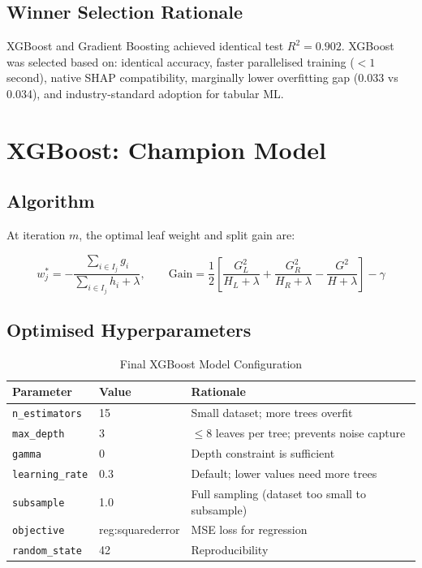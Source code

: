 \documentclass[12pt,a4paper]{report}
\begin{document}
\section{Winner Selection Rationale}

XGBoost and Gradient Boosting achieved identical test $R^2 = 0.902$. XGBoost was selected based on: identical accuracy, faster parallelised training ($< 1$ second), native SHAP compatibility, marginally lower overfitting gap (0.033 vs 0.034), and industry-standard adoption for tabular ML.

\chapter{XGBoost: Champion Model}

\section{Algorithm}

At iteration $m$, the optimal leaf weight and split gain are:

\begin{equation}
  w_j^* = -\frac{\sum_{i \in I_j} g_i}{\sum_{i \in I_j} h_i + \lambda}, \qquad
  \text{Gain} = \frac{1}{2}\left[\frac{G_L^2}{H_L+\lambda} + \frac{G_R^2}{H_R+\lambda} - \frac{G^2}{H+\lambda}\right] - \gamma
\end{equation}

\section{Optimised Hyperparameters}

\begin{table}[H]
\centering
\caption{Final XGBoost Model Configuration}
\begin{tabular}{lll}
\toprule
\textbf{Parameter} & \textbf{Value} & \textbf{Rationale} \\
\midrule
\texttt{n\_estimators}  & 15               & Small dataset; more trees overfit \\
\texttt{max\_depth}     & 3                & $\leq 8$ leaves per tree; prevents noise capture \\
\texttt{gamma}          & 0                & Depth constraint is sufficient \\
\texttt{learning\_rate} & 0.3              & Default; lower values need more trees \\
\texttt{subsample}      & 1.0              & Full sampling (dataset too small to subsample) \\
\texttt{objective}      & reg:squarederror & MSE loss for regression \\
\texttt{random\_state}  & 42               & Reproducibility \\
\bottomrule
\end{tabular}
\end{table}
\end{document}
